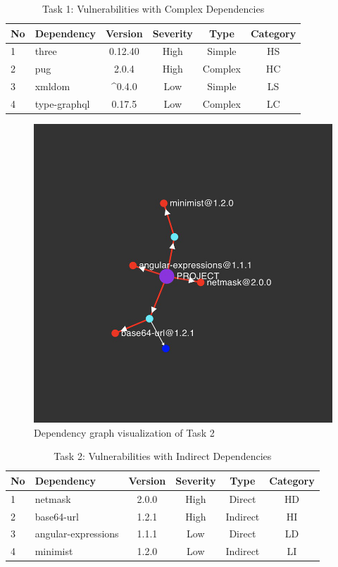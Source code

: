 \documentclass[conference]{IEEEtran}
\begin{document}
\begin{table}[tb]
	\centering
	\caption{Task 1: Vulnerabilities with Complex Dependencies}
	\begin{tabular}{llcccc}
		\toprule
		No & Dependency & Version & Severity & Type & Category \\
		\midrule
		1 & three & 0.12.40 & High & Simple & HS \\
		2 & pug & 2.0.4 & High & Complex &  HC \\
		3 & xmldom & \^{}0.4.0 & Low & Simple & LS \\
		4 & type-graphql & 0.17.5 & Low & Complex & LC \\
		\bottomrule
	\end{tabular}
	\label{table:cha-teat1}
\end{table}

\begin{figure}[tb]
	\centering
	\includegraphics[width=0.8\columnwidth]{Figures/Achilles-Test2.png}
	\caption{Dependency graph visualization of Task 2}
	\label{fig:graphtest2}
\end{figure}
	
\begin{table}[t]
	\centering
	\caption{Task 2: Vulnerabilities with Indirect Dependencies}
	\begin{tabular}{llcccc}
		\toprule
		No & Dependency & Version & Severity & Type & Category \\
		\midrule
		1 & netmask & 2.0.0 & High & Direct & HD \\ 
		2 & base64-url & 1.2.1 & High & Indirect & HI \\
		3 & angular-expressions & 1.1.1 & Low & Direct & LD \\ 
		4 & minimist & 1.2.0 & Low & Indirect & LI \\
		\bottomrule
	\end{tabular}
	\label{table:cha-test2}
\end{table}
\end{document}
